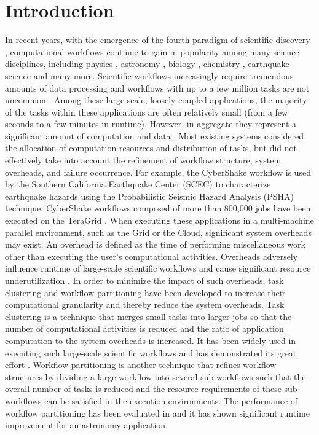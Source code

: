 \chapter{Introduction}


In recent years, with the emergence of the fourth paradigm of scientific discovery \cite{Hey2009}, computational workflows continue to gain in popularity among many science disciplines, including physics \cite{Deelman2002}, astronomy \cite{Sakellariou2010}, biology \cite{Lathers2006, Oinn2004}, chemistry \cite{Wieczorek2005}, earthquake science \cite{Maechling2007} and many more. Scientific workflows increasingly require tremendous amounts of data processing and workflows with up to a few million tasks are not uncommon \cite{Callaghan2011}. Among these large-scale, loosely-coupled applications, the majority of the tasks within these applications are often relatively small (from a few seconds to a few minutes in runtime). However, in aggregate they represent a significant amount of computation and data \cite{Deelman2002}. Most existing systems considered the allocation of computation resources and distribution of tasks, but did not effectively take into account the refinement of workflow structure, system overheads, and failure occurrence.
For example, the CyberShake workflow \cite{Rynge2012} is used by the Southern California Earthquake Center (SCEC) \cite{SCEC} to characterize earthquake hazards using the Probabilistic Seismic Hazard Analysis (PSHA) technique. CyberShake workflows composed of more than 800,000 jobs have been executed on the TeraGrid \cite{TeraGrid}. When executing these applications in a multi-machine parallel environment, such as the Grid or the Cloud, significant system overheads may exist. An overhead is defined as the time of performing miscellaneous work other than executing the user's computational activities.  Overheads adversely influence runtime of large-scale scientific workflows and cause significant resource underutilization \cite{Chen2011}. 
In order to minimize the impact of such overheads, task clustering \cite{Singh2008,Hussin2010,Zhao2009} and workflow partitioning \cite{Kumar2002, Hedayat2009} have been developed to increase their computational granularity and thereby reduce the system overheads. Task clustering is a technique that merges small tasks into larger jobs so that the number of computational activities is reduced and the ratio of application computation to the system overheads is increased. It has been widely used in executing such large-scale scientific workflows and has demonstrated its great effort \cite{Singh2008}. Workflow partitioning is another technique that refines workflow structures by dividing a large workflow into several sub-workflows such that the overall number of tasks is reduced and the resource requirements of these sub-workflows can be satisfied in the execution environments. The performance of workflow partitioning has been evaluated in \cite{Rynge2012} and it has shown significant runtime improvement for an astronomy application. 
 
